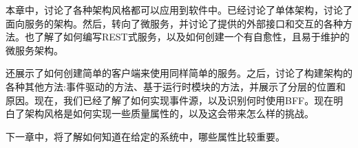本章中，讨论了各种架构风格都可以应用到软件中。已经讨论了单体架构，讨论了面向服务的架构。然后，转向了微服务，并讨论了提供的外部接口和交互的各种方法。也了解了如何编写REST式服务，以及如何创建一个有自愈性，且易于维护的微服务架构。

还展示了如何创建简单的客户端来使用同样简单的服务。之后，讨论了构建架构的各种其他方法:事件驱动的方法、基于运行时模块的方法，并展示了分层的位置和原因。现在，我们已经了解了如何实现事件源，以及识别何时使用BFF。现在明白了架构风格是如何实现一些质量属性的，以及这会带来怎么样的挑战。

下一章中，将了解如何知道在给定的系统中，哪些属性比较重要。


